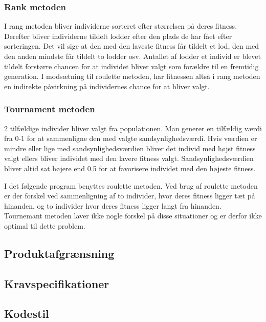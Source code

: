 \subsubsection{Rank metoden}

I rang metoden bliver individerne sorteret efter størrelsen på deres fitness. Derefter bliver individerne tildelt lodder efter den plads de har fået efter sorteringen. Det vil sige at den med den laveste fitness får tildelt et lod, den med den anden mindste får tildelt to lodder osv. Antallet af lodder et individ er blevet tildelt forstørre chancen for at individet bliver valgt som forældre til en fremtidig generation. I modsætning til roulette metoden, har fitnessen altså i rang metoden en indirekte påvirkning på individernes chance for at bliver valgt. 

\subsubsection{Tournament metoden}

2 tilfældige individer bliver valgt fra populationen. Man generer en tilfældig værdi fra 0-1 for at sammenligne den med valgte sandsynlighedsværdi. Hvis værdien er mindre eller lige med sandsynlighedsværdien bliver det individ med højst fitness valgt ellers bliver individet med den lavere fitness valgt. Sandsynlighedsværdien bliver altid sat højere end 0.5 for at favorisere individet med den højeste fitness. 

I det følgende program benyttes roulette metoden. Ved brug af roulette metoden er der forskel ved sammenligning af to individer, hvor deres fitness ligger tæt på hinanden, og to individer hvor deres fitness ligger langt fra hinanden. Tournemant metoden laver ikke nogle forskel på disse situationer og er derfor ikke optimal til dette problem.

\subsection{Produktafgrænsning}
  

\subsection{Kravspecifikationer}
  

\subsection{Kodestil}
  